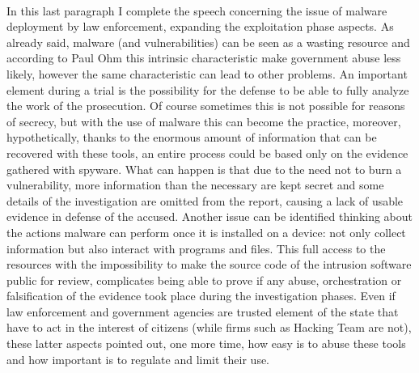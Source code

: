 \paragraph{}
In this last paragraph I complete the speech concerning the issue of malware deployment by law enforcement, expanding the exploitation phase aspects. As already said, malware (and vulnerabilities) can be seen as a wasting resource and according to Paul Ohm this intrinsic characteristic make government abuse less likely\cite{malware_as_wasting_resource}, however the same characteristic can lead to other problems. An important element during a trial is the possibility for the defense to be able to fully analyze the work of the prosecution. Of course sometimes this is not possible for reasons of secrecy, but with the use of malware this can become the practice, moreover, hypothetically, thanks to the enormous amount of information that can be recovered with these tools, an entire process could be based only on the evidence gathered with spyware. What can happen is that due to the need not to burn a vulnerability, more information than the necessary are kept secret and some details of the investigation are omitted from the report, causing a lack of usable evidence in defense of the accused. Another issue can be identified thinking about the actions malware can perform once it is installed on a device: not only collect information but also interact with programs and files. This full access to the resources with the impossibility to make the source code of the intrusion software public for review, complicates being able to prove if any abuse, orchestration or falsification of the evidence took place during the investigation phases. Even if law enforcement and government agencies are trusted element of the state that have to act in the interest of citizens (while firms such as Hacking Team are not), these latter aspects pointed out, one more time, how easy is to abuse these tools and how important is to regulate and limit their use.        